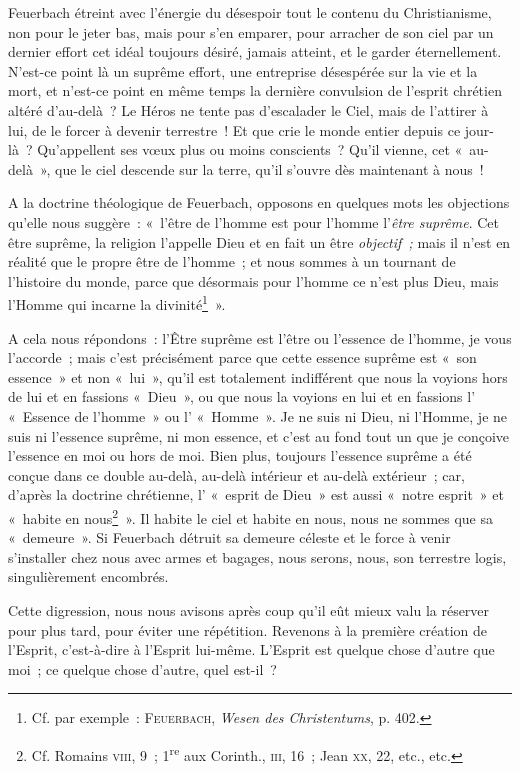 \documentclass[french,twoside]{book} %
\begin{document}
Feuerbach étreint avec l’énergie du désespoir tout le contenu du Christianisme, non pour le jeter bas, mais pour s’en emparer, pour arracher de son ciel par un dernier effort cet idéal toujours désiré, jamais atteint, et le garder éternellement. N’est-ce point là un suprême effort, une entreprise désespérée sur la vie et la mort, et n’est-ce point en même temps  la dernière convulsion de l’esprit chrétien altéré d’au-delà ? Le Héros ne tente pas d’escalader le Ciel, mais de l’attirer à lui, de le forcer à devenir terrestre ! Et que crie le monde entier depuis ce jour-là ? Qu’appellent ses vœux plus ou moins conscients ? Qu’il vienne, cet « au-delà », que le ciel descende sur la terre, qu’il s’ouvre dès maintenant à nous !\par
A la doctrine théologique de Feuerbach, opposons en quelques mots les objections qu’elle nous suggère : « l’être de l’homme est pour l’homme l’\emph{être suprême}. Cet être suprême, la religion l’appelle Dieu et en fait un être \emph{objectif ;} mais il n’est en réalité que le propre être de l’homme ; et nous sommes à un tournant de l’histoire du monde, parce que désormais pour l’homme ce n’est plus Dieu, mais l’Homme qui incarne la divinité\footnote{ \noindent Cf. par exemple : F{\scshape euerbach}, \emph{Wesen des Christentums}, p. 402.
 } ».\par
A cela nous répondons : l’Être suprême est l’être ou l’essence de l’homme, je vous l’accorde ; mais c’est précisément parce que cette essence suprême est « son essence » et non « lui », qu’il est totalement indifférent que nous la voyions hors de lui et en fassions « Dieu », ou que nous la voyions en lui et en fassions l’ « Essence de l’homme » ou l’ « Homme ». Je ne suis ni Dieu, ni l’Homme, je ne suis ni l’essence suprême, ni mon essence, et c’est au fond tout un que je conçoive l’essence en moi ou hors de moi. Bien plus, toujours l’essence suprême a été conçue dans ce double au-delà, au-delà intérieur et au-delà extérieur ; car, d’après la doctrine chrétienne, l’ « esprit de Dieu » est aussi « notre esprit » et « habite en nous\footnote{ \noindent Cf. Romains {\scshape viii}, 9 ; 1\textsuperscript{re} aux Corinth., {\scshape iii}, 16 ; Jean {\scshape xx}, 22, etc., etc.
 } ». Il habite le ciel et habite en nous, nous ne sommes que sa « demeure ». Si Feuerbach détruit sa demeure céleste et le force à venir s’installer chez nous avec  armes et bagages, nous serons, nous, son terrestre logis, singulièrement encombrés.\par
Cette digression, nous nous avisons après coup qu’il eût mieux valu la réserver pour plus tard, pour éviter une répétition. Revenons à la première création de l’Esprit, c’est-à-dire à l’Esprit lui-même. L’Esprit est quelque chose d’autre que moi ; ce quelque chose d’autre, quel est-il ?
\end{document}
